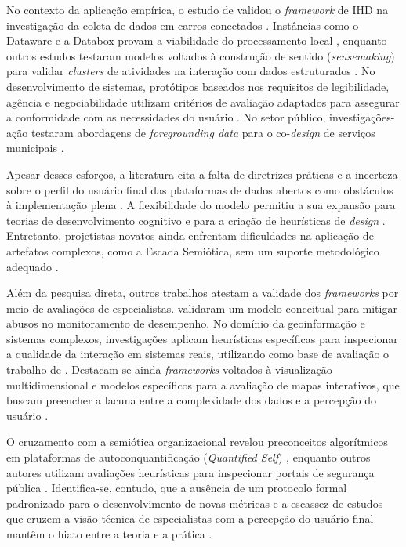 \documentclass[
	12pt,				%
	oneside,			%
	a4paper,			%
	english,			%
	brazil				%
	]{abntex2ppgsi}
\begin{document}
    No contexto da aplicação empírica, o estudo de  validou o \textit{framework} de IHD na investigação da coleta de dados em carros conectados \cite{DOWTHWAITE2024, Locoro2020}. Instâncias como o Dataware e a Databox provam a viabilidade do processamento local \cite{Crabtree2016}, enquanto outros estudos testaram modelos voltados à construção de sentido (\textit{sensemaking}) para validar \textit{clusters} de atividades na interação com dados estruturados \cite{koesten2021talking}. No desenvolvimento de sistemas, protótipos baseados nos requisitos de legibilidade, agência e negociabilidade utilizam critérios de avaliação adaptados para assegurar a conformidade com as necessidades do usuário \cite{Belizario2023Interacao}. No setor público, investigações-ação testaram abordagens de \textit{foregrounding data} para o co-\textit{design} de serviços municipais \cite{seidelin2020foregrounding}.

    Apesar desses esforços, a literatura cita a falta de diretrizes práticas e a incerteza sobre o perfil do usuário final das plataformas de dados abertos como obstáculos à implementação plena \cite{Belizario2023Interacao}. A flexibilidade do modelo permitiu a sua expansão para teorias de desenvolvimento cognitivo e para a criação de heurísticas de \textit{design} \cite{Elhamdadi2022, Bartram2022, chalhoub2024useful}. Entretanto, projetistas novatos ainda enfrentam dificuldades na aplicação de artefatos complexos, como a Escada Semiótica, sem um suporte metodológico adequado \cite{Strey2019Human}.

    Além da pesquisa direta, outros trabalhos atestam a validade dos \textit{frameworks} por meio de avaliações de especialistas.  validaram um modelo conceitual para mitigar abusos no monitoramento de desempenho. No domínio da geoinformação e sistemas complexos, investigações aplicam heurísticas específicas para inspecionar a qualidade da interação em sistemas reais, utilizando como base de avaliação o trabalho de  \cite{Capeleti2024Human}. Destacam-se ainda \textit{frameworks} voltados à visualização multidimensional e modelos específicos para a avaliação de mapas interativos, que buscam preencher a lacuna entre a complexidade dos dados e a percepção do usuário \cite{Capeleti2024Human}.

    O cruzamento com a semiótica organizacional revelou preconceitos algorítmicos em plataformas de autoconquantificação (\textit{Quantified Self}) \cite{Hornung2015}, enquanto outros autores utilizam avaliações heurísticas para inspecionar portais de segurança pública \cite{Victorelli2024Adopting, durango2024data, capeleti2023heuristic}. Identifica-se, contudo, que a ausência de um protocolo formal padronizado para o desenvolvimento de novas métricas e a escassez de estudos que cruzem a visão técnica de especialistas com a percepção do usuário final mantêm o hiato entre a teoria e a prática \cite{Capeleti2024Human}.
\end{document}

